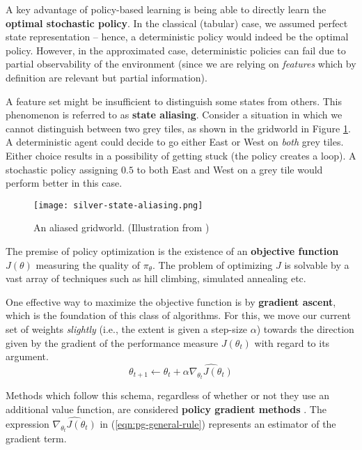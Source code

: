 A key advantage of policy-based learning is being able to directly learn the \textbf{optimal stochastic policy}.
In the classical (tabular) case, we assumed perfect state representation -- hence, a deterministic policy would indeed be the optimal policy.
However, in the approximated case, deterministic policies can fail due to partial observability of the environment (since we are relying on \emph{features} which by definition are relevant but partial information).

A feature set might be insufficient to distinguish some states from others. This phenomenon is referred to as \textbf{state aliasing}.
Consider a situation in which we cannot distinguish between two grey tiles, as shown in the gridworld in Figure \ref{fig:state-aliasing}.
A deterministic agent could decide to go either East or West on \emph{both} grey tiles.
Either choice results in a possibility of getting stuck (the policy creates a loop).
A stochastic policy assigning $0.5$ to both East and West on a grey tile would perform better in this case.

\begin{figure}[h]
    \centering
    \texttt{[image: silver-state-aliasing.png]}
    \caption{An aliased gridworld. (Illustration from \cite{silver-lectures})}
    \label{fig:state-aliasing}
\end{figure}

The premise of policy optimization is the existence of an \textbf{objective function} $J(\theta)$ measuring the quality of $\pi_{\theta}$.
The problem of optimizing $J$ is solvable by a vast array of techniques such as hill climbing, simulated annealing etc.

One effective way to maximize the objective function is by \textbf{gradient ascent}, which is the foundation of this class of algorithms.
For this, we move our current set of weights \emph{slightly} (i.e., the extent is given a step-size $\alpha$) towards the direction given by the gradient of the performance measure $J(\theta_{t})$ with regard to its argument.
\begin{equation} \label{eqn:pg-general-rule}
    \theta_{t+1} \leftarrow \theta_{t} + \alpha \widehat{ \nabla_{\theta_{t}} J(\theta_{t}) }
\end{equation}

Methods which follow this schema, regardless of whether or not they use an additional value function, are considered \textbf{policy gradient methods} \cite{rlai}.
The expression $\widehat{ \nabla_{\theta_{t}} J(\theta_{t}) }$ in (\ref{eqn:pg-general-rule}) represents an estimator of the gradient term.

